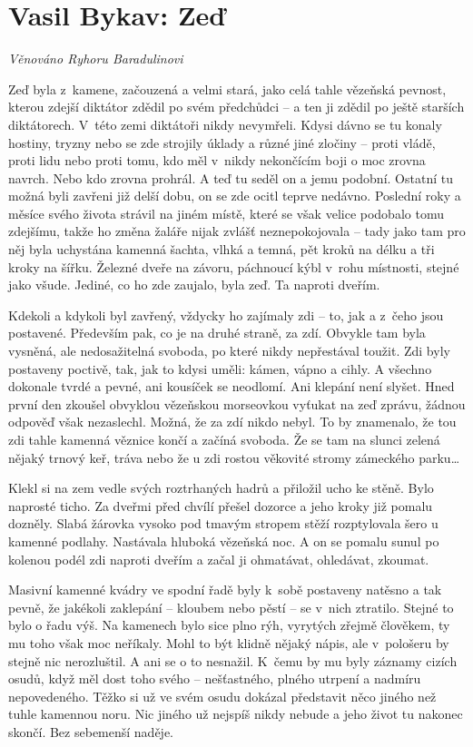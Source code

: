 \section{Vasil Bykav: Zeď}

\noindent
\textit{Věnováno Ryhoru Baradulinovi}

\smallskip

Zeď byla z kamene, začouzená a velmi stará, jako celá tahle vězeňská pevnost, kterou zdejší diktátor zdědil po svém předchůdci -- a ten ji zdědil po ještě starších diktátorech. V této zemi diktátoři nikdy nevymřeli. Kdysi dávno se tu konaly hostiny, tryzny nebo se zde strojily úklady a různé jiné zločiny -- proti vládě, proti lidu nebo proti tomu, kdo měl v nikdy nekončícím boji o moc zrovna navrch. Nebo kdo zrovna prohrál. A teď tu seděl on a jemu podobní. Ostatní tu možná byli zavřeni již delší dobu, on se zde ocitl teprve nedávno. Poslední roky a měsíce svého života strávil na jiném místě, které se však velice podobalo tomu zdejšímu, takže ho změna žaláře nijak zvlášť neznepokojovala -- tady jako tam pro něj byla uchystána kamenná šachta, vlhká a temná, pět kroků na délku a tři kroky na šířku. Železné dveře na závoru, páchnoucí kýbl v rohu místnosti, stejné jako všude. Jediné, co ho zde zaujalo, byla zeď. Ta naproti dveřím.

Kdekoli a kdykoli byl zavřený, vždycky ho zajímaly zdi -- to, jak a z čeho jsou postavené. Především pak, co je na druhé straně, za zdí. Obvykle tam byla vysněná, ale nedosažitelná svoboda, po které nikdy nepřestával toužit. Zdi byly postaveny poctivě, tak, jak to kdysi uměli: kámen, vápno a cihly. A všechno dokonale tvrdé a pevné, ani kousíček se neodlomí. Ani klepání není slyšet. Hned první den zkoušel obvyklou vězeňskou morseovkou vyťukat na zeď zprávu, žádnou odpověď však nezaslechl. Možná, že za zdí nikdo nebyl. To by znamenalo, že tou zdi tahle kamenná věznice končí a začíná svoboda. Že se tam na slunci zelená nějaký trnový keř, tráva nebo že u zdi rostou věkovité stromy zámeckého parku\ldots

Klekl si na zem vedle svých roztrhaných hadrů a přiložil ucho ke stěně. Bylo naprosté ticho. Za dveřmi před chvílí přešel dozorce a jeho kroky již pomalu dozněly. Slabá žárovka vysoko pod tmavým stropem stěží rozptylovala šero u kamenné podlahy. Nastávala hluboká vězeňská noc. A on se pomalu sunul po kolenou podél zdi naproti dveřím a začal ji ohmatávat, ohledávat, zkoumat.

Masivní kamenné kvádry ve spodní řadě byly k sobě postaveny natěsno a tak pevně, že jakékoli zaklepání -- kloubem nebo pěstí -- se v nich ztratilo. Stejné to bylo o řadu výš. Na kamenech bylo sice plno rýh, vyrytých zřejmě člověkem, ty mu toho však moc neříkaly. Mohl to být klidně nějaký nápis, ale v pološeru by stejně nic nerozluštil. A ani se o to nesnažil. K čemu by mu byly záznamy cizích osudů, když měl dost toho svého -- nešťastného, plného utrpení a nadmíru nepovedeného. Těžko si už ve svém osudu dokázal představit něco jiného než tuhle kamennou noru. Nic jiného už nejspíš nikdy nebude a jeho život tu nakonec skončí. Bez sebemenší naděje.


